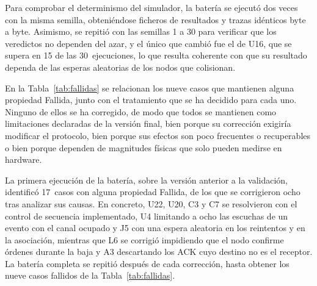 Para comprobar el determinismo del simulador, la batería se ejecutó dos veces con la misma semilla, obteniéndose ficheros de resultados y trazas idénticos byte a byte. Asimismo, se repitió con las semillas 1 a 30 para verificar que los veredictos no dependen del azar, y el único que cambió fue el de U16, que se supera en 15 de las 30~ejecuciones, lo que resulta coherente con que su resultado dependa de las esperas aleatorias de los nodos que colisionan.

En la Tabla~\ref{tab:fallidas} se relacionan los nueve casos que mantienen alguna propiedad Fallida, junto con el tratamiento que se ha decidido para cada uno. Ninguno de ellos se ha corregido, de modo que todos se mantienen como limitaciones declaradas de la versión final, bien porque su corrección exigiría modificar el protocolo, bien porque sus efectos son poco frecuentes o recuperables o bien porque dependen de magnitudes físicas que solo pueden medirse en hardware.

La primera ejecución de la batería, sobre la versión anterior a la validación, identificó 17~casos con alguna propiedad Fallida, de los que se corrigieron ocho tras analizar sus causas. En concreto, U22, U20, C3 y C7 se resolvieron con el control de secuencia implementado, U4 limitando a ocho las escuchas de un evento con el canal ocupado y J5 con una espera aleatoria en los reintentos y en la asociación, mientras que L6 se corrigió impidiendo que el nodo confirme órdenes durante la baja y A3 descartando los ACK cuyo destino no es el receptor. La batería completa se repitió después de cada corrección, hasta obtener los nueve casos fallidos de la Tabla~\ref{tab:fallidas}.

